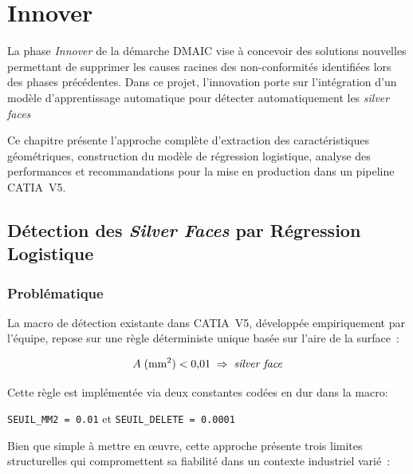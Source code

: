 \chapter{Innover}
\label{cp:innover}

La phase \textit{Innover} de la démarche DMAIC vise à concevoir des solutions nouvelles permettant de supprimer les causes racines des non-conformités identifiées lors des phases précédentes. Dans ce projet, l'innovation porte sur l'intégration d'un modèle d'apprentissage automatique pour détecter automatiquement les \textit{silver faces}

Ce chapitre présente l'approche complète d'extraction des caractéristiques géométriques, construction du modèle de régression logistique, analyse des performances et recommandations pour la mise en production dans un pipeline CATIA~V5.

\section{Détection des \textit{Silver Faces} par Régression Logistique}
\label{sec:innover-silver-faces}

\subsection{Problématique}
\label{subsec:problematique}

La macro de détection existante dans CATIA~V5, développée empiriquement par l'équipe, repose sur une règle déterministe unique basée sur l'aire de la surface~:

\begin{equation}
    A\;(\text{mm}^2) < 0{,}01 \;\Rightarrow\; \text{\textit{silver face}}
    \label{eq:decision-rule-old}
\end{equation}

Cette règle est implémentée via deux constantes codées en dur dans la macro:
\begin{center}
    \texttt{SEUIL\_MM2 = 0.01} \quad et \quad \texttt{SEUIL\_DELETE = 0.0001}
\end{center}

Bien que simple à mettre en œuvre, cette approche présente trois limites structurelles qui compromettent sa fiabilité dans un contexte industriel varié~:

